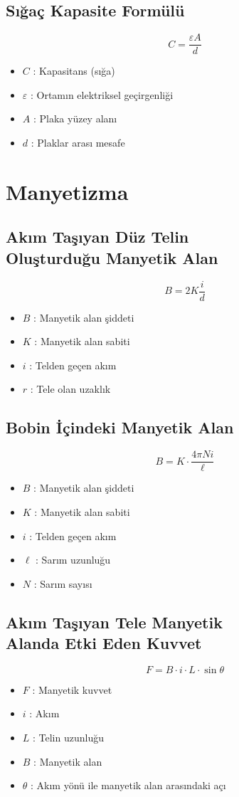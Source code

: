 \documentclass[a4paper, 11pt, titlepage]{article}
\begin{document}
\subsection{Sığaç Kapasite Formülü}
\[
C = \frac{\varepsilon A}{d}
\]
\begin{itemize}
  \item $C$ : Kapasitans (sığa)
  \item $\varepsilon$ : Ortamın elektriksel geçirgenliği
  \item $A$ : Plaka yüzey alanı
  \item $d$ : Plaklar arası mesafe
\end{itemize}

\section{Manyetizma}

\subsection[Akım Taşıyan Düz Telde Manyetik Alan]{Akım Taşıyan Düz Telin \\Oluşturduğu Manyetik Alan}
\[
B = 2K\frac{i}{d}
\]
\begin{itemize}
  \item $B$ : Manyetik alan şiddeti
  \item $K$ : Manyetik alan sabiti
  \item $i$ : Telden geçen akım
  \item $r$ : Tele olan uzaklık
\end{itemize}

\subsection{Bobin İçindeki Manyetik Alan}
\[
B = K \cdot \frac{4\pi Ni}{\ell}
\]
\begin{itemize}
  \item $B$ : Manyetik alan şiddeti
  \item $K$ : Manyetik alan sabiti
  \item $i$ : Telden geçen akım
  \item $\ell$ : Sarım uzunluğu
  \item $N$ : Sarım sayısı
\end{itemize}
\subsection[Tele Etki Eden Manyetik Kuvvet]{Akım Taşıyan Tele Manyetik \\Alanda Etki Eden Kuvvet}
\[
F = B \cdot i \cdot L \cdot \sin \theta
\]
\begin{itemize}
  \item $F$ : Manyetik kuvvet
  \item $i$ : Akım
  \item $L$ : Telin uzunluğu
  \item $B$ : Manyetik alan
  \item $\theta$ : Akım yönü ile manyetik alan arasındaki açı
\end{itemize}
\end{document}
